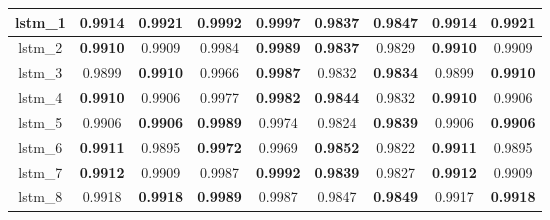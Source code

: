 \begin{table}[h]
\begin{tabular} {|c|c|c|c|c|c|c|c|c| }
        lstm\_1  & 0.9914                              & \textbf{\cellcolor{green!50}0.9921} & 0.9992                              & \textbf{0.9997}                & 0.9837                              & \textbf{0.9847}                     & 0.9914                              & \textbf{\cellcolor{green!50}0.9921} \\ \hline
        lstm\_2  & \textbf{0.9910}                     & 0.9909                              & 0.9984                              & \textbf{0.9989}                & \textbf{0.9837}                     & 0.9829                              & \textbf{0.9910}                     & 0.9909                              \\ \hline
        lstm\_3  & 0.9899                              & \textbf{0.9910}                     & 0.9966                              & \textbf{0.9987}                & 0.9832                              & \textbf{0.9834}                     & 0.9899                              & \textbf{0.9910}                     \\ \hline
        lstm\_4  & \textbf{0.9910}                     & 0.9906                              & 0.9977                              & \textbf{0.9982}                & \textbf{0.9844}                     & 0.9832                              & \textbf{0.9910}                     & 0.9906                              \\ \hline
        lstm\_5  & 0.9906                              & \textbf{0.9906}                     & \textbf{0.9989}                     & 0.9974                         & 0.9824                              & \textbf{0.9839}                     & 0.9906                              & \textbf{0.9906}                     \\ \hline
        lstm\_6  & \textbf{0.9911}                     & 0.9895                              & \textbf{0.9972}                     & 0.9969                         & \textbf{0.9852}                     & 0.9822                              & \textbf{0.9911}                     & 0.9895                              \\ \hline
        lstm\_7  & \textbf{0.9912}                     & 0.9909                              & 0.9987                              & \textbf{0.9992}                & \textbf{0.9839}                     & 0.9827                              & \textbf{0.9912}                     & 0.9909                              \\ \hline
        lstm\_8  & 0.9918                              & \textbf{0.9918}                     & \textbf{0.9989}                     & 0.9987                         & 0.9847                              & \textbf{0.9849}                     & 0.9917                              & \textbf{0.9918}                     \\ \hline

\end{tabular}
\end{table}
